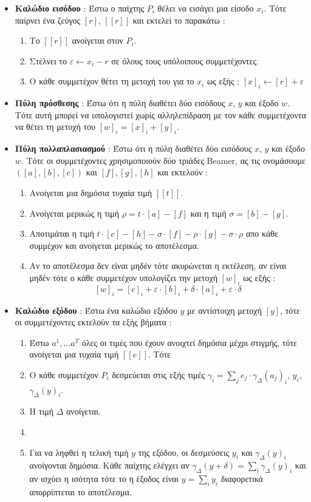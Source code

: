 \begin{itemize}
    \item \textbf{Καλώδιο εισόδου} : Έστω ο παίχτης $P_i$ θέλει να εισάγει μια είσοδο $x_i$. Τότε παίρνει ένα ζεύγος $[r]$, $[[r]]$ και εκτελεί το παρακάτω :
    \begin{enumerate}
        \item Το $[[r]]$ ανοίγεται στον $P_i$.
        \item Στέλνει το $ε \gets x_i - r$ σε όλους τους υπόλοιπους συμμετέχοντες.
        \item Ο κάθε συμμετέχον θέτει τη μετοχή του για το $x_i$ ως εξής : $[x]_i \gets [r] + ε$
    \end{enumerate}
    \item \textbf{Πύλη πρόσθεσης} : Έστω ότι η πύλη διαθέτει δύο εισόδους $x$, $y$ και έξοδο $w$. Τότε αυτή μπορεί να υπολογιστεί χωρίς αλληλεπίδραση με τον κάθε συμμετέχοντα να θέτει τη μετοχή του $[w]_i = [x]_i + [y]_i$.
    \item \textbf{Πύλη πολλαπλασιασμού} : Έστω ότι η πύλη διαθέτει δύο εισόδους $x$, $y$ και έξοδο $w$. Τότε οι συμμετέχοντες χρησιμοποιούν δύο τριάδες Beamer, ας τις ονομάσουμε $([a], [b], [c])$ και $[f], [g], [h]$ και εκτελούν :
    \begin{enumerate}
        \item Ανοίγεται μια δημόσια τυχαία τιμή $[[t]]$.
        \item Ανοίγεται μερικώς η τιμή $ρ = t \cdot [a] - [f]$ και η τιμή $σ=[b]-[g]$.
        \item Αποτιμάται η τιμή $t \cdot [c] - [h] - σ \cdot [f] - ρ \cdot [g] - σ \cdot ρ$ απο κάθε συμμέχον και ανοίγεται μερικώς το αποτέλεσμα.
        \item Αν το αποτέλεσμα δεν είναι μηδέν τότε ακυρώνεται η εκτέλεση, αν είναι μηδέν τότε ο κάθε συμμετέχον υπολογίζει την μετοχή $[w]_i$ ως εξής :
        \[
            [w]_i = [c]_i + ε \cdot [b]_i + δ \cdot [a]_i + ε \cdot δ
        \]
    \end{enumerate}
    \item \textbf{Καλώδιο εξόδου} : Έστω ένα καλώδιο εξόδου $y$ με αντίστοιχη μετοχή $[y]$, τότε οι συμμετέχοντες εκτελούν τα εξής βήματα :
    \begin{enumerate}
        \item Έστω $a^1, \ldots a^T$ όλες οι τιμές που έχουν ανοιχτεί δημόσια μέχρι στιγμής, τότε ανοίγεται μια τυχαία τιμή $[[e]]$. Τότε
        \item Ο κάθε συμμετέχον $P_i$ δεσμεύεται στις εξής τιμές $γ_i = \sum_j e_j \cdot γ_Δ(a_j)_i$, $y_i$, $γ_Δ(y)_i$.
        \item Η τιμή $Δ$ ανοίγεται.
        \item {}
        \item Για να ληφθεί η τελική τιμή $y$ της εξόδου, οι δεσμεύσεις $y_i$ και $γ_Δ(y)_i$ ανοίγονται δημόσια. Κάθε παίχτης ελέγχει αν $γ_Δ(y+δ) = \sum_i γ_Δ(y)_i$ και αν ισχύει η ισότητα τότε το η έξοδος είναι $y = \sum_i y_i$ διαφορετικά απορρίπτεται το αποτέλεσμα.
    \end{enumerate}
\end{itemize}